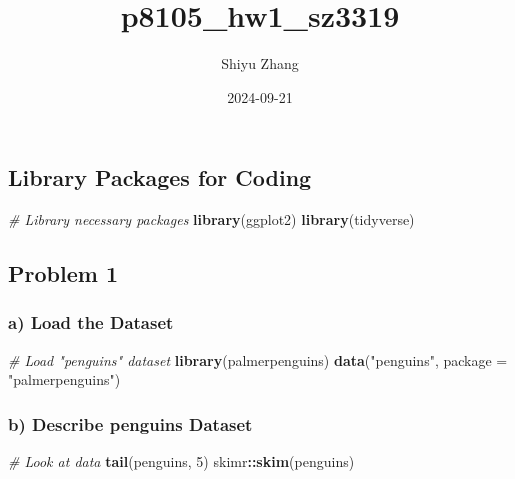 \documentclass[
]{article}
\title{p8105\_hw1\_sz3319}
\author{Shiyu Zhang}
\date{2024-09-21}
\newenvironment{Shaded}{\begin{snugshade}}{\end{snugshade}}
\newcommand{\AttributeTok}[1]{\textcolor[rgb]{0.13,0.29,0.53}{#1}}
\newcommand{\CommentTok}[1]{\textcolor[rgb]{0.56,0.35,0.01}{\textit{#1}}}
\newcommand{\DecValTok}[1]{\textcolor[rgb]{0.00,0.00,0.81}{#1}}
\newcommand{\FunctionTok}[1]{\textcolor[rgb]{0.13,0.29,0.53}{\textbf{#1}}}
\newcommand{\NormalTok}[1]{#1}
\newcommand{\SpecialCharTok}[1]{\textcolor[rgb]{0.81,0.36,0.00}{\textbf{#1}}}
\newcommand{\StringTok}[1]{\textcolor[rgb]{0.31,0.60,0.02}{#1}}
\begin{document}
\maketitle

\subsection{Library Packages for
Coding}\label{library-packages-for-coding}

\begin{Shaded}
\begin{Highlighting}[]
\CommentTok{\# Library necessary packages}
\FunctionTok{library}\NormalTok{(ggplot2)}
\FunctionTok{library}\NormalTok{(tidyverse)}
\end{Highlighting}
\end{Shaded}

\subsection{Problem 1}\label{problem-1}

\subsubsection{a) Load the Dataset}\label{a-load-the-dataset}

\begin{Shaded}
\begin{Highlighting}[]
\CommentTok{\# Load "penguins" dataset}
\FunctionTok{library}\NormalTok{(palmerpenguins)}
\FunctionTok{data}\NormalTok{(}\StringTok{"penguins"}\NormalTok{, }\AttributeTok{package =} \StringTok{"palmerpenguins"}\NormalTok{)}
\end{Highlighting}
\end{Shaded}

\subsubsection{\texorpdfstring{b) Describe \textbf{penguins}
Dataset}{b) Describe penguins Dataset}}\label{b-describe-penguins-dataset}

\begin{Shaded}
\begin{Highlighting}[]
\CommentTok{\# Look at data}
\FunctionTok{tail}\NormalTok{(penguins, }\DecValTok{5}\NormalTok{)}
\NormalTok{skimr}\SpecialCharTok{::}\FunctionTok{skim}\NormalTok{(penguins)}
\end{Highlighting}
\end{Shaded}
\end{document}
